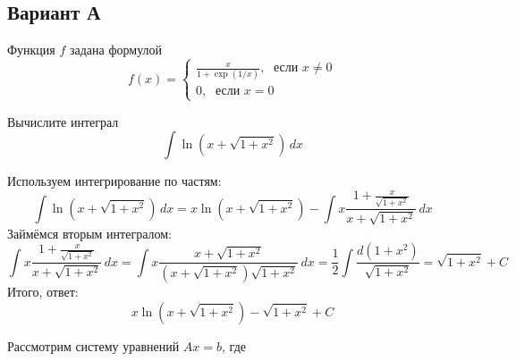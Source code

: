 \documentclass[addpoints, answers]{exam} %
\begin{document}
\subsection{Вариант А}
\begin{questions}

\question Функция $f$ задана формулой
\[
f(x)=\begin{cases}
\frac{x}{1+\exp(1/x)}, \; \text{ если } x\neq 0 \\
0, \; \text{ если } x = 0
\end{cases}
\]

\question[10] Вычислите интеграл
\[
\int  \ln (x + \sqrt{1+x^2}) \, dx
\]

\begin{solution}
Используем интегрирование по частям:
\[
\int \ln (x + \sqrt{1+x^2}) \, dx = x \ln (x + \sqrt{1+x^2}) - \int x \frac{1+\frac{x}{\sqrt{1+x^2}}}{x + \sqrt{1+x^2}} \, dx
\]
Займёмся вторым интегралом:
\[
\int x \frac{1+\frac{x}{\sqrt{1+x^2}}}{x + \sqrt{1+x^2}} \, dx =\int x \frac{x+\sqrt{1+x^2}}{(x + \sqrt{1+x^2})\sqrt{1+x^2}} \, dx =
\frac{1}{2}\int  \frac{d(1+x^2)}{\sqrt{1+x^2}} = \sqrt{1+x^2} + C
\]
Итого, ответ:
\[
x \ln (x + \sqrt{1+x^2}) - \sqrt{1+x^2} + C
\]

\end{solution}

\question Рассмотрим систему уравнений $Ax=b$, где


\end{questions}
\end{document}
